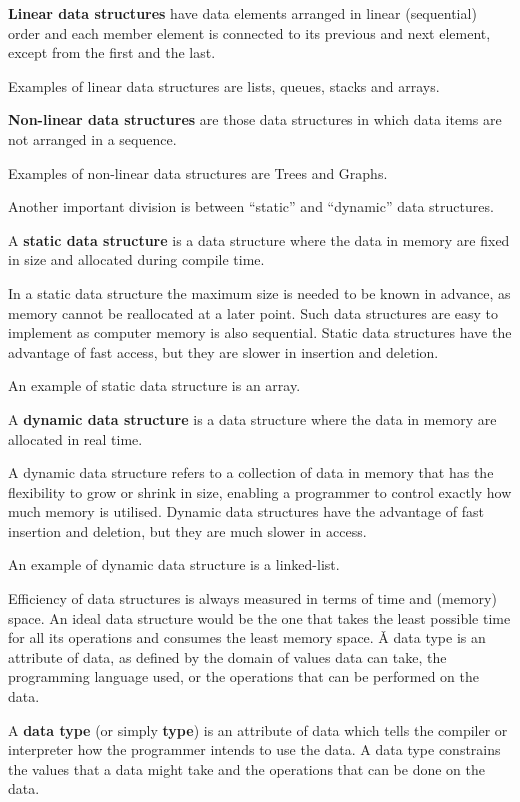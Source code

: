 \textbf{Linear data structures} have data elements arranged in linear (sequential) order and each member element is
connected to its previous and next element, except from the first and the last.
\ed

\be
Examples of linear data structures are lists, queues, stacks and arrays.
\ee

\textbf{Non-linear data structures} are those data structures in which data items are not arranged in a sequence.
\ed

\be
Examples of non-linear data structures are Trees and Graphs.
\ee

Another important division is between ``static'' and ``dynamic'' data structures.

A \textbf{static data structure} is a data structure where the data in memory are fixed in size and allocated during
compile time.
\ed

In a static data structure the maximum size is needed to be known in advance, as memory cannot be reallocated at a
later point. Such data structures are easy to implement as computer memory is also sequential. Static data structures
have the advantage of fast access, but they are slower in insertion and deletion.

\be
An example of static data structure is an array.
\ee

A \textbf{dynamic data structure} is a data structure where the data in memory are allocated in real time.
\ed

A dynamic data structure refers to a collection of data in memory that has the flexibility to grow or shrink in size,
enabling a programmer to control exactly how much memory is utilised. Dynamic data structures have the advantage of
fast insertion and deletion, but they are much slower in access.

\be
An example of dynamic data structure is a linked-list.
\ee

Efficiency of data structures is always measured in terms of time and (memory) space. An ideal data structure would
be the one that takes the least possible time for all its operations and consumes the least memory space. \v

A data type is an attribute of data, as defined by the domain of values data can take, the programming language used,
or the operations that can be performed on the data.

A \textbf{data type} (or simply \textbf{type}) is an attribute of data which tells the compiler or interpreter how
the programmer intends to use the data. A data type constrains the values that a data might take and the operations
that can be done on the data.
\ed

